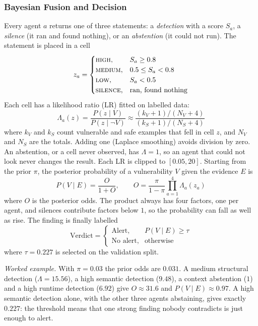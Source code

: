 \documentclass[conference]{IEEEtran}
\begin{document}
\subsubsection{Bayesian Fusion and Decision}
Every agent $a$ returns one of three statements: a \emph{detection} with a
score $S_a$, a \emph{silence} (it ran and found nothing), or an
\emph{abstention} (it could not run). The statement is placed in a cell
\begin{equation}
z_a=\begin{cases}
\textsc{high}, & S_a\ge0.8\\
\textsc{medium}, & 0.5\le S_a<0.8\\
\textsc{low}, & S_a<0.5\\
\textsc{silence}, & \text{ran, found nothing}
\end{cases}
\label{eq:cell}
\end{equation}
Each cell has a likelihood ratio (LR) fitted on labelled data:
\begin{equation}
\Lambda_a(z)=\frac{P(z\mid V)}{P(z\mid\neg V)}\approx
\frac{(k_V+1)/(N_V+4)}{(k_S+1)/(N_S+4)}
\label{eq:lr}
\end{equation}
where $k_V$ and $k_S$ count vulnerable and safe examples that fell in cell
$z$, and $N_V$ and $N_S$ are the totals. Adding one (Laplace smoothing)
avoids division by zero. An abstention, or a cell never observed, has
$\Lambda=1$, so an agent that could not look never changes the result.
Each LR is clipped to $[0.05,20]$. Starting from the prior $\pi$, the
posterior probability of a vulnerability $V$ given the evidence $E$ is
\begin{equation}
P(V\mid E)=\frac{O}{1+O},\qquad
O=\frac{\pi}{1-\pi}\prod_{a=1}^{4}\Lambda_a(z_a)
\label{eq:post}
\end{equation}
where $O$ is the posterior odds. The product always has four factors, one
per agent, and silences contribute factors below $1$, so the probability
can fall as well as rise. The finding is finally labelled
\begin{equation}
\mathrm{Verdict}=\begin{cases}
\text{Alert},& P(V\mid E)\ge\tau\\
\text{No alert},& \text{otherwise}
\end{cases}
\label{eq:verdict}
\end{equation}
where $\tau=0.227$ is selected on the validation split.

\textit{Worked example.} With $\pi=0.03$ the prior odds are $0.031$. A
medium structural detection ($\Lambda=15.56$), a high semantic detection
($9.48$), a context abstention ($1$) and a high runtime detection ($6.92$)
give $O\approx31.6$ and $P(V\mid E)\approx0.97$. A high semantic detection
alone, with the other three agents abstaining, gives exactly $0.227$: the
threshold means that one strong finding nobody contradicts is just enough
to alert.
\end{document}

